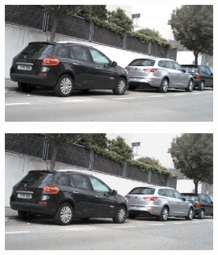 \documentclass[a4paper]{ctexart}
\begin{document}
\begin{figure}[htbp]
\begin{subfigure}{0.08\textwidth}
			\label{fig：Gamma=0.7, Gauss Noise = 1.0}
		\end{subfigure} \\
		
		\vspace{-15pt}
		
		\begin{subfigure}{0.02\textwidth}
			\captionsetup{font=scriptsize}
			\caption*{}
			\vspace{-2pt}
		\end{subfigure}
		\begin{subfigure}{0.08\textwidth}
			\captionsetup{font=scriptsize}
			\includegraphics[width=\linewidth]{picture/Edge Detection/degrade/RGB_001 Gamma=0.8, Gauss Noise=0.0}
			\label{fig: Gamma=0.8, Gauss Noise = 0.0}
		\end{subfigure}
		\begin{subfigure}{0.08\textwidth}
			\captionsetup{font=scriptsize}
			\includegraphics[width=\linewidth]{picture/Edge Detection/degrade/RGB_001 Gamma=0.8, Gauss Noise=0.1}

\end{subfigure}
\end{figure}
\end{document}
